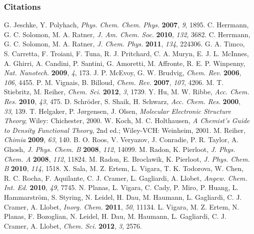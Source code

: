 \documentclass[%
 preprint, linenumbers,
 amsmath,amssymb,
 aps, physrev,
]{revtex4-2}
\begin{document}
\subsubsection{Citations}

\begin{thebibliography}{144}
 G. Jeschke, Y. Polyhach, \textit{Phys. Chem. Chem. Phys.} \textbf{2007}, \textit{9}, 1895.
 C. Herrmann, G. C. Solomon, M. A. Ratner, \textit{J. Am. Chem. Soc.} \textbf{2010}, \textit{132}, 3682.
 C. Herrmann, G. C. Solomon, M. A. Ratner, \textit{J. Chem. Phys.} \textbf{2011}, \textit{134}, 224306.
 G. A. Timco, S. Carretta, F. Troiani, F. Tuna, R. J. Pritchard, C. A. Muryn, E. J. L. McInnes, A. Ghirri, A. Candini, P. Santini, G. Amoretti, M. Affronte, R. E. P. Winpenny, \textit{Nat. Nanotech.} \textbf{2009}, \textit{4}, 173.
 J. P. McEvoy, G. W. Brudvig, \textit{Chem. Rev.} \textbf{2006}, \textit{106}, 4455.
 P. M. Vignais, B. Billoud, \textit{Chem. Rev.} \textbf{2007}, \textit{107}, 4206.
 M. T. Stiebritz, M. Reiher, \textit{Chem. Sci.} \textbf{2012}, \textit{3}, 1739.
 Y. Hu, M. W. Ribbe, \textit{Acc. Chem. Res.} \textbf{2010}, \textit{43}, 475.
 D. Schr\"oder, S. Shaik, H. Schwarz, \textit{Acc. Chem. Res.} \textbf{2000}, \textit{33}, 139.
 T. Helgaker, P. J\o rgensen, J. Olsen, \textit{Molecular Electronic Structure Theory}; Wiley: Chichester, 2000.
 W. Koch, M. C. Holthausen, \textit{A Chemist’s Guide to Density Functional Theory}, 2nd ed.; Wiley-VCH: Weinheim, 2001.
 M. Reiher, \textit{Chimia} \textbf{2009}, \textit{63}, 140.
 B. O. Roos, V. Veryazov, J. Conradie, P. R. Taylor, A. Ghosh, \textit{J. Phys. Chem. B} \textbf{2008}, \textit{112}, 14099.
 M. Radon, K. Pierloot, \textit{J. Phys. Chem. A} \textbf{2008}, \textit{112}, 11824.
 M. Radon, E. Broclawik, K. Pierloot, \textit{J. Phys. Chem. B} \textbf{2010}, \textit{114}, 1518.
 X. Sala, M. Z. Ertem, L. Vigara, T. K. Todorova, W. Chen, R. C. Rocha, F. Aquilante, C. J. Cramer, L. Gagliardi, A. Llobet, \textit{Angew. Chem. Int. Ed.} \textbf{2010}, \textit{49}, 7745.
 N. Planas, L. Vigara, C. Cady, P. Miro, P. Huang, L. Hammarstr\"om, S. Styring, N. Leidel, H. Dau, M. Haumann, L. Gagliardi, C. J. Cramer, A. Llobet, \textit{Inorg. Chem.} \textbf{2011}, \textit{50}, 11134.
 L. Vigara, M. Z. Ertem, N. Planas, F. Bozoglian, N. Leidel, H. Dau, M. Haumann, L. Gagliardi, C. J. Cramer, A. Llobet, \textit{Chem. Sci.} \textbf{2012}, \textit{3}, 2576.

\end{thebibliography}
\end{document}
